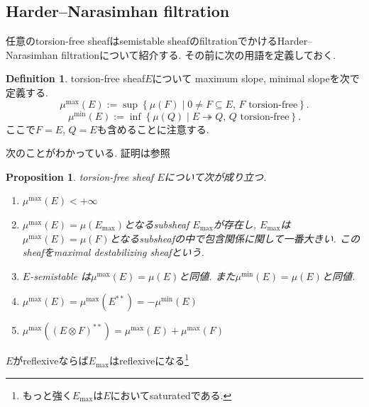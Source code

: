 \documentclass[dvipdfmx,a4paper,11pt]{article} %
\newtheorem{prop}[thm]{Proposition}
\theoremstyle{definition}
\newtheorem{defn}[thm]{Definition}
\theoremstyle{remark}
\numberwithin{equation}{section}
\begin{document}
\subsection{Harder--Narasimhan filtration}

任意のtorsion-free sheafはsemistable sheafのfiltrationでかけるHarder--Narasimhan filtrationについて紹介する. その前に次の用語を定義しておく.
\begin{defn} \cite[2章]{Lazicnote}
torsion-free sheaf$E$について maximum slope, minimal slopeを次で定義する. 
$$
\mu^{\max}(E) := \sup \left\{ \mu(F) \mid 0 \neq F \subseteq E, \, F \text{ torsion-free} \right\}.
$$
$$
\mu^{\min}(E) := \inf \left\{ \mu(Q) \mid E \twoheadrightarrow Q, \, Q \text{ torsion-free} \right\}.
$$
ここで$F =E$, $Q=E$も含めることに注意する. 
\end{defn}

次のことがわかっている. 証明は\cite[2章]{Lazicnote}参照
\begin{prop}\cite[2章]{Lazicnote}
\label{prop-max-property}
torsion-free sheaf $E$について次が成り立つ. 
\begin{enumerate}
\item $\mu^{\max}(E) <+ \infty$
\item $\mu^{\max}(E) =\mu(E_{\max})$となるsubsheaf 
$E_{\max}$が存在し,  $E_{\max}$は$\mu^{\max}(E) =\mu(F)$となるsubsheafの中で包含関係に関して一番大きい. このsheafをmaximal destabilizing sheafという. 
\item  $E$-semistable は$\mu^{\max}(E) = \mu(E)$と同値. また$\mu^{\min}(E) = \mu(E)$と同値. 
\item $\mu^{\max}(E)=\mu^{\max}(E^{**})=-\mu^{\min}(E)$
\item $\mu^{\max}((E \otimes F)^{**})=\mu^{\max}(E)+\mu^{\max}(F)$
\end{enumerate}
\end{prop}
$E$がreflexiveならば$E_{\max}$はreflexiveになる\footnote{もっと強く$E_{\max}$は$E$においてsaturatedである.}
\end{document}
